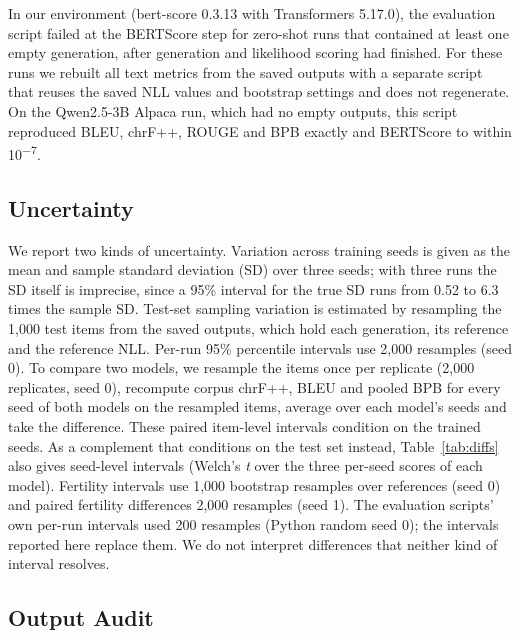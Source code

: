 \documentclass{article}
\begin{document}
In our environment (bert-score 0.3.13 with Transformers 5.17.0), the evaluation script failed at the BERTScore step for zero-shot runs that contained at least one empty generation, after generation and likelihood scoring had finished. For these runs we rebuilt all text metrics from the saved outputs with a separate script that reuses the saved NLL values and bootstrap settings and does not regenerate. On the Qwen2.5-3B Alpaca run, which had no empty outputs, this script reproduced BLEU, chrF++, ROUGE and BPB exactly and BERTScore to within 10\textsuperscript{$-$7}.

\subsection{Uncertainty}\label{sec:uncert}

We report two kinds of uncertainty. Variation across training seeds is given as the mean and sample standard deviation (SD) over three seeds; with three runs the SD itself is imprecise, since a 95\% interval for the true SD runs from 0.52 to 6.3 times the sample SD. Test-set sampling variation is estimated by resampling the 1,000 test items from the saved outputs, which hold each generation, its reference and the reference NLL. Per-run 95\% percentile intervals use 2,000 resamples (seed 0). To compare two models, we resample the items once per replicate (2,000 replicates, seed 0), recompute corpus chrF++, BLEU and pooled BPB for every seed of both models on the resampled items, average over each model's seeds and take the difference. These paired item-level intervals condition on the trained seeds. As a complement that conditions on the test set instead, Table~\ref{tab:diffs} also gives seed-level intervals (Welch's \emph{t} over the three per-seed scores of each model). Fertility intervals use 1,000 bootstrap resamples over references (seed 0) and paired fertility differences 2,000 resamples (seed 1). The evaluation scripts' own per-run intervals used 200 resamples (Python random seed 0); the intervals reported here replace them. We do not interpret differences that neither kind of interval resolves.

\subsection{Output Audit}\label{sec:audit}
\end{document}
